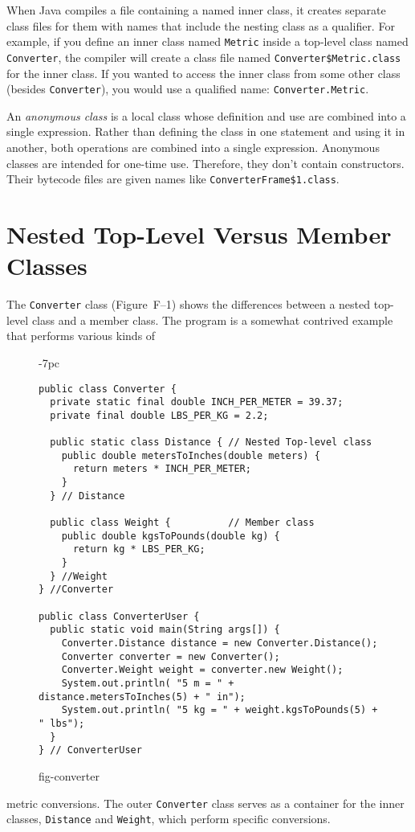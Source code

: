 When Java compiles a file containing a named inner class, it creates
separate class files for them with names that include the nesting
class as a qualifier.  For example, if you define an inner class named
{\tt Metric} inside a top-level class named {\tt Converter}, the
compiler will create a class file named {\tt Converter\$Metric.class}
for the inner class.   If you wanted to access the inner class from
some other class (besides {\tt Converter}), you would use a qualified
name: {\tt Converter.Metric}.


An {\it anonymous class} is a local class whose definition and use are
combined into a single expression.  Rather than defining the class in
one statement and using it in another, both operations are combined
into a single expression.  Anonymous classes are intended for one-time
use.  Therefore, they don't contain constructors.  Their bytecode files
are given names like {\tt ConverterFrame\$1.class}.

\section*{Nested Top-Level Versus Member Classes}
\label{nested-top-level-versus-member-classes}
\noindent The {\tt Converter} class (Figure~F--1) shows the
differences between a nested top-level class and a member class.   The
program is a somewhat contrived example that performs various kinds of
\begin{figure}[h!]
\jjjprogstart
\begin{jjjlistingleft}[33pc]{-7pc}
\begin{lstlisting}
public class Converter {
  private static final double INCH_PER_METER = 39.37;
  private final double LBS_PER_KG = 2.2;

  public static class Distance { // Nested Top-level class
    public double metersToInches(double meters) {
      return meters * INCH_PER_METER;
    }
  } // Distance

  public class Weight {          // Member class
    public double kgsToPounds(double kg) {
      return kg * LBS_PER_KG;
    }
  } //Weight
} //Converter

public class ConverterUser {
  public static void main(String args[]) {
    Converter.Distance distance = new Converter.Distance();
    Converter converter = new Converter();
    Converter.Weight weight = converter.new Weight();
    System.out.println( "5 m = " + distance.metersToInches(5) + " in");
    System.out.println( "5 kg = " + weight.kgsToPounds(5) + " lbs");
  }
} // ConverterUser
\end{lstlisting}
\end{jjjlistingleft}
{fig-converter}
\end{figure}
metric conversions.  The outer {\tt Converter} class serves as a
container for the inner classes, {\tt Distance} and {\tt Weight},
which perform specific conversions.


